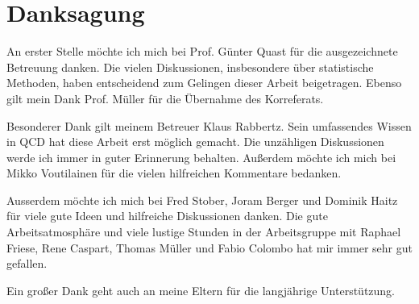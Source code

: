 \chapter*{Danksagung}

An erster Stelle möchte ich mich bei Prof. Günter Quast für die ausgezeichnete
Betreuung danken. Die vielen Diskussionen, insbesondere über statistische
Methoden, haben entscheidend zum Gelingen dieser Arbeit beigetragen. Ebenso gilt
mein Dank Prof. Müller für die Übernahme des Korreferats. 

Besonderer Dank gilt meinem Betreuer Klaus Rabbertz. Sein umfassendes Wissen in
QCD hat diese Arbeit erst möglich gemacht. Die unzähligen Diskussionen werde ich
immer in guter Erinnerung behalten. Außerdem möchte ich mich bei Mikko
Voutilainen für die vielen hilfreichen Kommentare bedanken. 

Ausserdem möchte ich mich bei Fred Stober, Joram Berger und Dominik Haitz für
viele gute Ideen und hilfreiche Diskussionen danken. Die gute Arbeitsatmosphäre
und viele lustige Stunden in der Arbeitsgruppe mit Raphael Friese, Rene Caspart,
Thomas Müller und Fabio Colombo hat mir immer sehr gut gefallen.

Ein großer Dank geht auch an meine Eltern für die langjährige Unterstützung.

\cleardoublepage %
